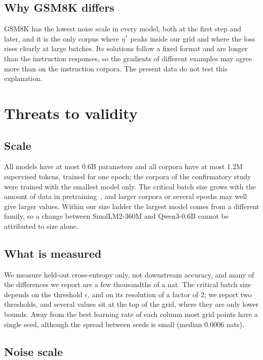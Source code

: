 \documentclass[10pt]{article}
\begin{document}
\subsection{Why GSM8K differs}

GSM8K has the lowest noise scale in every model, both at the first step and later, and it is the only corpus where $\eta^*$ peaks inside our grid and where the loss rises clearly at large batches. Its solutions follow a fixed format and are longer than the instruction responses, so the gradients of different examples may agree more than on the instruction corpora. The present data do not test this explanation.

\section{Threats to validity}\label{sec:threats}

\subsection{Scale}

All models have at most 0.6B parameters and all corpora have at most 1.2M supervised tokens, trained for one epoch; the corpora of the confirmatory study were trained with the smallest model only. The critical batch size grows with the amount of data in pretraining~\citep{zhang2025cbs}, and larger corpora or several epochs may well give larger values. Within our size ladder the largest model comes from a different family, so a change between SmolLM2-360M and Qwen3-0.6B cannot be attributed to size alone.

\subsection{What is measured}

We measure held-out cross-entropy only, not downstream accuracy, and many of the differences we report are a few thousandths of a nat. The critical batch size depends on the threshold $\epsilon$, and on its resolution of a factor of 2; we report two thresholds, and several values sit at the top of the grid, where they are only lower bounds. Away from the best learning rate of each column most grid points have a single seed, although the spread between seeds is small (median 0.0006 nats).

\subsection{Noise scale}
\end{document}
